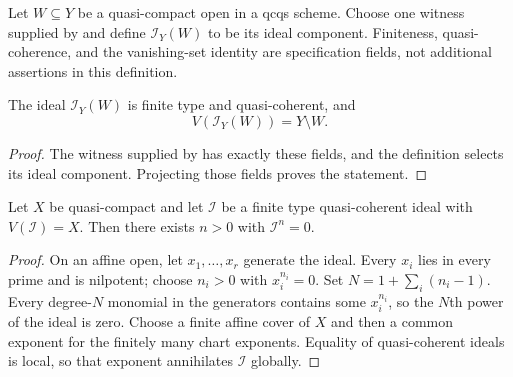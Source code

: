 \begin{definition}
  \label{def:nagata-qc-open-complement-ideal}

  Let $W\subseteq Y$ be a quasi-compact open in a qcqs scheme.  Choose one
  witness supplied by
   and define
  $\mathcal I_Y(W)$ to be its ideal component.  Finiteness, quasi-coherence,
  and the vanishing-set identity are specification fields, not additional
  assertions in this definition.
\end{definition}

\begin{lemma}
  \label{lemma:nagata-qc-open-complement-ideal}

  The ideal $\mathcal I_Y(W)$ is finite type and quasi-coherent, and
  \[
    V(\mathcal I_Y(W))=Y\setminus W.
  \]
\end{lemma}

\begin{proof}
  The witness supplied by
   has exactly these
  fields, and the definition selects its ideal component.  Projecting those
  fields proves the statement.
\end{proof}

\begin{lemma}
  \label{lemma:nagata-finite-type-nil-ideal-nilpotent}

  Let $X$ be quasi-compact and let $\mathcal I$ be a finite type
  quasi-coherent ideal with $V(\mathcal I)=X$.  Then there exists $n>0$ with
  $\mathcal I^n=0$.
\end{lemma}

\begin{proof}
  On an affine open, let $x_1,\ldots,x_r$ generate the ideal.  Every $x_i$
  lies in every prime and is nilpotent; choose $n_i>0$ with $x_i^{n_i}=0$.
  Set $N=1+\sum_i(n_i-1)$.  Every degree-$N$ monomial in the generators
  contains some $x_i^{n_i}$, so the $N$th power of the ideal is zero.  Choose
  a finite affine cover of $X$ and then a common exponent for the finitely many chart
  exponents.  Equality of quasi-coherent ideals is local, so that exponent
  annihilates $\mathcal I$ globally.
\end{proof}

